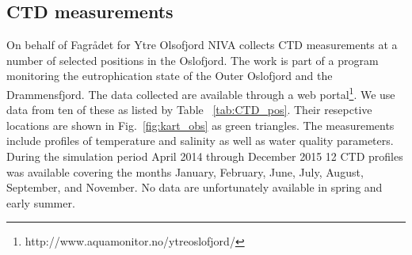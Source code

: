 \subsection{CTD measurements}
\label{subsec:CTDo}
On behalf of Fagr{\aa}det for Ytre Olsofjord NIVA collects CTD measurements at a number of selected positions in the Oslofjord. The work is part of a program monitoring the eutrophication state of the Outer Oslofjord and the Drammensfjord. The data collected are available through a web portal\footnote{http://www.aquamonitor.no/ytreoslofjord/}. We use data from ten of these as listed by Table ~\ref{tab:CTD_pos}. Their resepctive locations are shown in Fig.~\ref{fig:kart_obs} as green triangles. The measurements include profiles of temperature and salinity as well as water quality parameters. During the simulation period April 2014 through December 2015 12 CTD profiles was available covering the months January, February, June, July, August, September, and November. No data are unfortunately available in spring and early summer. 

